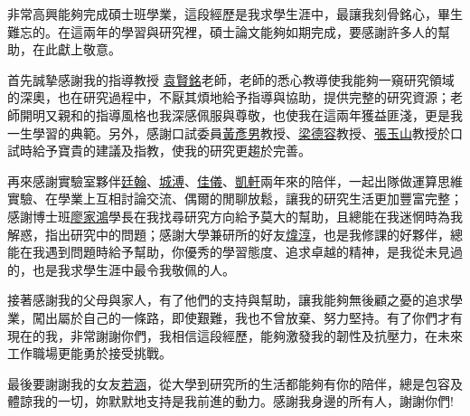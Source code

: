 \begin{acknowledgement}%

    非常高興能夠完成碩士班學業，這段經歷是我求學生涯中，最讓我刻骨銘心，畢生難忘的。在這兩年的學習與研究裡，碩士論文能夠如期完成，要感謝許多人的幫助，在此獻上敬意。

    首先誠摯感謝我的指導教授 \underline{袁賢銘}老師，老師的悉心教導使我能夠一窺研究領域的深奧，也在研究過程中，不厭其煩地給予指導與協助，提供完整的研究資源；老師開明又親和的指導風格也我深感佩服與尊敬，也使我在這兩年獲益匪淺，更是我一生學習的典範。另外，感謝口試委員\underline{黃彥男}教授、\underline{梁德容}教授、\underline{張玉山}教授於口試時給予寶貴的建議及指教，使我的研究更趨於完善。
    
    再來感謝實驗室夥伴\underline{廷翰}、\underline{城溥}、\underline{佳儀}、\underline{凱軒}兩年來的陪伴，一起出隊做運算思維實驗、在學業上互相討論交流、偶爾的閒聊放鬆，讓我的研究生活更加豐富完整；感謝博士班\underline{廖家鴻}學長在我找尋研究方向給予莫大的幫助，且總能在我迷惘時為我解惑，指出研究中的問題；感謝大學兼研所的好友\underline{煒淳}，也是我修課的好夥伴，總能在我遇到問題時給予幫助，你優秀的學習態度、追求卓越的精神，是我從未見過的，也是我求學生涯中最令我敬佩的人。
    
    接著感謝我的父母與家人，有了他們的支持與幫助，讓我能夠無後顧之憂的追求學業，闖出屬於自己的一條路，即使艱難，我也不曾放棄、努力堅持。有了你們才有現在的我，非常謝謝你們，我相信這段經歷，能夠激發我的韌性及抗壓力，在未來工作職場更能勇於接受挑戰。
    
    最後要謝謝我的女友\underline{若涵}，從大學到研究所的生活都能夠有你的陪伴，總是包容及體諒我的一切，妳默默地支持是我前進的動力。感謝我身邊的所有人，謝謝你們!
\end{acknowledgement}